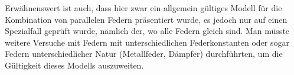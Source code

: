 Erwähnenswert ist auch, dass hier zwar ein allgemein gültiges Modell für die Kombination von parallelen Federn präsentiert wurde, es jedoch nur auf einen Spezialfall geprüft wurde, nämlich der, wo alle Federn gleich sind. Man müsste weitere Versuche mit Federn mit unterschiedlichen Federkonstanten oder sogar Federn unterschiedlicher Natur (Metallfeder, Dämpfer) durchführten, um die Gültigkeit dieses Modells auszuweiten. 


